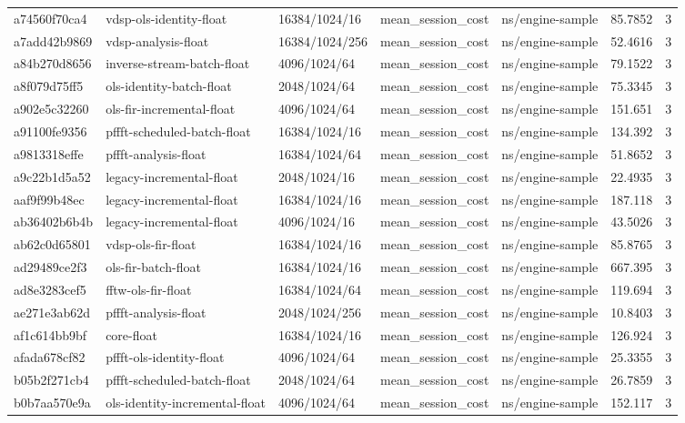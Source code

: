 \begin{longtable}{lllllrr}
a74560f70ca4 & vdsp-ols-identity-float & 16384/1024/16 & mean\_session\_cost & ns/engine-sample & 85.7852 & 3 \\
a7add42b9869 & vdsp-analysis-float & 16384/1024/256 & mean\_session\_cost & ns/engine-sample & 52.4616 & 3 \\
a84b270d8656 & inverse-stream-batch-float & 4096/1024/64 & mean\_session\_cost & ns/engine-sample & 79.1522 & 3 \\
a8f079d75ff5 & ols-identity-batch-float & 2048/1024/64 & mean\_session\_cost & ns/engine-sample & 75.3345 & 3 \\
a902e5c32260 & ols-fir-incremental-float & 4096/1024/64 & mean\_session\_cost & ns/engine-sample & 151.651 & 3 \\
a91100fe9356 & pffft-scheduled-batch-float & 16384/1024/16 & mean\_session\_cost & ns/engine-sample & 134.392 & 3 \\
a9813318effe & pffft-analysis-float & 16384/1024/64 & mean\_session\_cost & ns/engine-sample & 51.8652 & 3 \\
a9c22b1d5a52 & legacy-incremental-float & 2048/1024/16 & mean\_session\_cost & ns/engine-sample & 22.4935 & 3 \\
aaf9f99b48ec & legacy-incremental-float & 16384/1024/16 & mean\_session\_cost & ns/engine-sample & 187.118 & 3 \\
ab36402b6b4b & legacy-incremental-float & 4096/1024/16 & mean\_session\_cost & ns/engine-sample & 43.5026 & 3 \\
ab62c0d65801 & vdsp-ols-fir-float & 16384/1024/16 & mean\_session\_cost & ns/engine-sample & 85.8765 & 3 \\
ad29489ce2f3 & ols-fir-batch-float & 16384/1024/16 & mean\_session\_cost & ns/engine-sample & 667.395 & 3 \\
ad8e3283cef5 & fftw-ols-fir-float & 16384/1024/64 & mean\_session\_cost & ns/engine-sample & 119.694 & 3 \\
ae271e3ab62d & pffft-analysis-float & 2048/1024/256 & mean\_session\_cost & ns/engine-sample & 10.8403 & 3 \\
af1c614bb9bf & core-float & 16384/1024/16 & mean\_session\_cost & ns/engine-sample & 126.924 & 3 \\
afada678cf82 & pffft-ols-identity-float & 4096/1024/64 & mean\_session\_cost & ns/engine-sample & 25.3355 & 3 \\
b05b2f271cb4 & pffft-scheduled-batch-float & 2048/1024/64 & mean\_session\_cost & ns/engine-sample & 26.7859 & 3 \\
b0b7aa570e9a & ols-identity-incremental-float & 4096/1024/64 & mean\_session\_cost & ns/engine-sample & 152.117 & 3 \\

\end{longtable}
